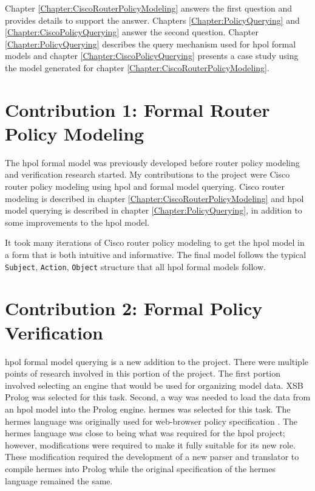 \documentclass[12pt,letterpaper]{report}
\begin{document}
Chapter \ref{Chapter:CiscoRouterPolicyModeling} answers the first question and provides details to support the answer. Chapters \ref{Chapter:PolicyQuerying} and \ref{Chapter:CiscoPolicyQuerying} answer the second question. Chapter \ref{Chapter:PolicyQuerying} describes the query mechanism used for \ac{hpol} formal models and chapter \ref{Chapter:CiscoPolicyQuerying} presents a case study using the model generated for chapter \ref{Chapter:CiscoRouterPolicyModeling}.

\section{Contribution 1: Formal Router Policy Modeling}
The \ac{hpol} formal model was previously developed before router policy modeling and verification research started. My contributions to the project were Cisco router policy modeling using \ac{hpol} and formal model querying. Cisco router modeling is described in chapter \ref{Chapter:CiscoRouterPolicyModeling} and \ac{hpol} model querying is described in chapter \ref{Chapter:PolicyQuerying}, in addition to some improvements to the \ac{hpol} model.

It took many iterations of Cisco router policy modeling to get the \ac{hpol} model in a form that is both intuitive and informative. The final model follows the typical \texttt{Subject}, \texttt{Action}, \texttt{Object} structure that all \ac{hpol} formal models follow. 

\section{Contribution 2: Formal Policy Verification}
\ac{hpol} formal model querying is a new addition to the project. There were multiple points of research involved in this portion of the project. The first portion involved selecting an engine that would be used for organizing model data. XSB Prolog was selected for this task. Second, a way was needed to load the data from an \ac{hpol} model into the Prolog engine. \ac{hermes} was selected for this task. The \ac{hermes} language was originally used for web-browser policy specification \cite{hifipolbro}. The \ac{hermes} language was close to being what was required for the \ac{hpol} project; however, modifications were required to make it fully suitable for its new role. These modification required the development of a new parser and translator to compile \ac{hermes} into Prolog while the original specification of the \ac{hermes} language remained the same.
\end{document}

